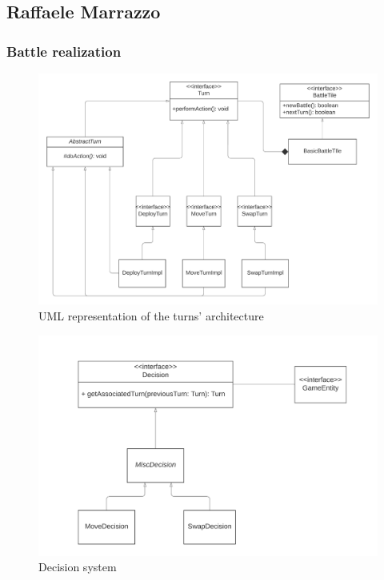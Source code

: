 \documentclass[12pt, a4paper]{report}
\theoremstyle{definition}
\begin{document}
    \subsection*{Raffaele Marrazzo}

        \subsubsection{Battle realization}
            
        \begin{figure}[H]
            \centering{}
            \caption{UML representation of the turns' architecture}
            \includegraphics[width=\textwidth]{turns}
        \end{figure}

        \begin{figure}[H]
            \centering{}
            \caption{Decision system}
            \includegraphics[width=\textwidth]{decisions}
        \end{figure}
\end{document}
